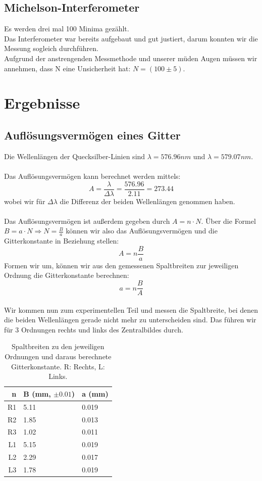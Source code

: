 \documentclass{article}
\begin{document}
\subsection{Michelson-Interferometer}
Es werden drei mal 100 Minima gezählt.\\
Das Interferometer war bereits aufgebaut und gut justiert, darum konnten wir die Messung sogleich durchführen.\\
Aufgrund der anstrengenden Messmethode und unserer müden Augen müssen wir annehmen, dass N eine Unsicherheit hat: $N=(100 \pm 5)$.

\section{Ergebnisse}
\subsection*{Auflösungsvermögen eines Gitter}
%
%
Die Wellenlängen der Quecksilber-Linien sind $\lambda=576.96nm$ und $\lambda=579.07nm$.\\
\\
Das Auflösungsvermögen kann berechnet werden mittels:
$$\boxed{A=\frac{\lambda}{\Delta\lambda}=\frac{576.96}{2.11}=273.44}$$
wobei wir für $\Delta\lambda$ die Differenz der beiden Wellenlängen genommen haben.\\
\\
Das Auflösungsvermögen ist außerdem gegeben durch $A=n\cdot N$. Über die Formel $B=a\cdot N \Rightarrow N=\frac{B}{a}$ können wir also das Auflösungsvermögen und die Gitterkonstante in Beziehung stellen:
$$A=n\frac{B}{a}$$
Formen wir um, können wir aus den gemessenen Spaltbreiten zur jeweiligen Ordnung die Gitterkonstante berechnen:
$$\boxed{a=n\frac{B}{A}}$$
\\
Wir kommen nun zum experimentellen Teil und messen die Spaltbreite, bei denen die beiden Wellenlängen gerade nicht mehr zu unterscheiden sind. Das führen wir für 3 Ordnungen rechts und links des Zentralbildes durch.
\begin{table}[H]
\begin{center}
\begin{tabular}{|r|l|l|}
\hline
n & B (mm, $\pm 0.01$) & a (mm)\\
\hline
R1 & 5.11 & 0.019\\
R2 & 1.85 & 0.013\\
R3 & 1.02 & 0.011\\
L1 & 5.15 & 0.019\\
L2 & 2.29 & 0.017\\
L3 & 1.78 & 0.019\\
\hline
\end{tabular}
\caption{Spaltbreiten zu den jeweiligen Ordnungen und daraus berechnete Gitterkonstante. R: Rechts, L: Links.}
\end{center}
\end{table}
\end{document}
